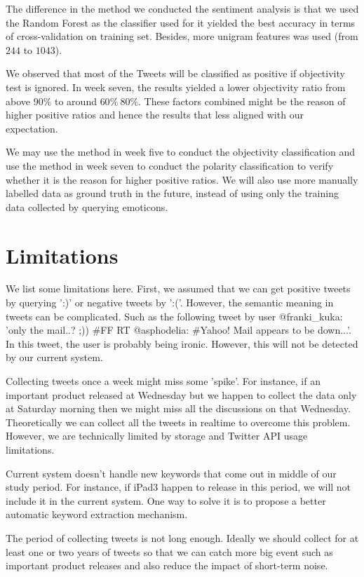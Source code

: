\documentclass[12pt]{article}
\begin{document}
The difference in the method we conducted the sentiment analysis is that we used the Random Forest as the classifier used for it yielded the best accuracy in terms of cross-validation on training set. Besides, more unigram features was used (from $244$ to $1043$). 

We observed that most of the Tweets will be classified as positive if objectivity test is ignored. In week seven, the results yielded a lower objectivity ratio from above $90\%$ to around $60\% ~ 80\%$. These factors combined might be the reason of higher positive ratios and hence the results that less aligned with our expectation.

We may use the method in week five to conduct the objectivity classification and use the method in week seven to conduct the polarity classification to verify whether it is the reason for higher positive ratios. We will also use more manually labelled data as ground truth in the future, instead of using only the training data collected by querying emoticons.

\section{Limitations}
We list some limitations here. First, we assumed that we can get positive tweets by querying ':)' or negative tweets by ':('. However, the semantic meaning in tweets can be complicated. Such as the following tweet by user @franki\_kuka: 'only the mail..? ;)) \#FF RT @asphodelia: \#Yahoo! Mail appears to be down...'. In this tweet, the user is probably being ironic. However, this will not be detected by our current system.

Collecting tweets once a week might miss some 'spike'. For instance, if an important product released at Wednesday but we happen to collect the data only at Saturday morning then we might miss all the discussions on that Wednesday. Theoretically we can collect all the tweets in realtime to overcome this problem. However, we are technically limited by storage and Twitter API usage limitations.

Current system doesn't handle new keywords that come out in middle of our study period. For instance, if iPad3 happen to release in this period, we will not include it in the current system. One way to solve it is to propose a better automatic keyword extraction mechanism.

The period of collecting tweets is not long enough. Ideally we should collect for at least one or two years of tweets so that we can catch more big event such as important product releases and also reduce the impact of short-term noise.
\end{document}
